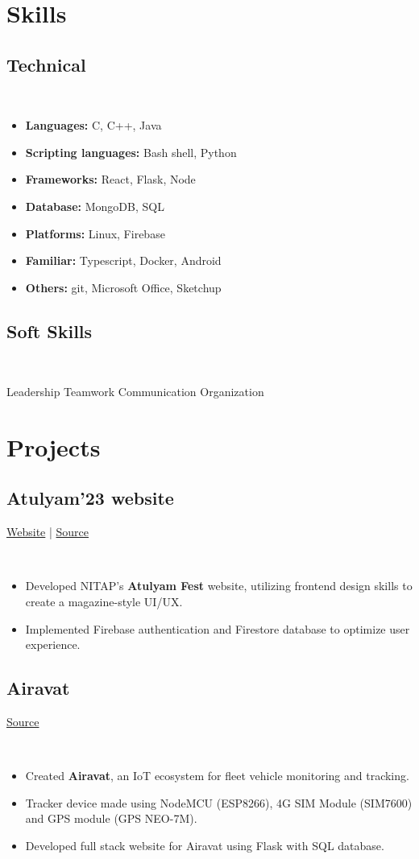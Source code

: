 \documentclass[]{article}
\newcommand{\subheading}[2]{
  {\subsection{#1}
  \hfill{#2}}\\
  \vspace{2pt}
}
\newenvironment{tightemize}{
\vspace{-8pt}\begin{itemize}\itemsep1pt \parskip0pt \parsep0pt}
{\end{itemize}\vspace{-\topsep}}
\begin{document}
\begin{multicols}{2}
\begin{flushleft}
    \section{Skills}
    \subheading{Technical}{}
    \begin{tightemize}
      \item \textbf{Languages:} C, C++, Java
      \item \textbf{Scripting languages:} Bash shell, Python
      \item \textbf{Frameworks:} React, Flask, Node
      \item \textbf{Database:} MongoDB, SQL
      \item \textbf{Platforms:} Linux, Firebase
      \item \textbf{Familiar:} Typescript, Docker, Android
      \item \textbf{Others:} git, Microsoft Office, Sketchup
    \end{tightemize}

    \subheading{Soft Skills}{}
    Leadership \textbullet{} Teamwork \textbullet{} Communication \textbullet{} Organization

    \section{Projects}

    \subheading{Atulyam'23 website}{
      \href{https://atulyam23.com}{Website} | 
      \href{https://github.com/tripathics/atulyam-2023}{Source} 
    }
    \begin{tightemize}
      \item Developed NITAP's \textbf{Atulyam Fest} website, utilizing frontend design skills to create a magazine-style UI/UX.
      \item Implemented Firebase authentication and Firestore database to optimize user experience.
    \end{tightemize}

    \subheading{Airavat}{\href{https://github.com/tripathics/airavat}{Source}}
    \begin{tightemize}
      \item Created \textbf{Airavat}, an IoT ecosystem for fleet vehicle monitoring and tracking.
      \item Tracker device made using NodeMCU (ESP8266), 4G SIM Module (SIM7600) and GPS module (GPS NEO-7M).
      \item Developed full stack website for Airavat using Flask with SQL database.
    \end{tightemize}


\end{flushleft}
\end{multicols}
\end{document}
